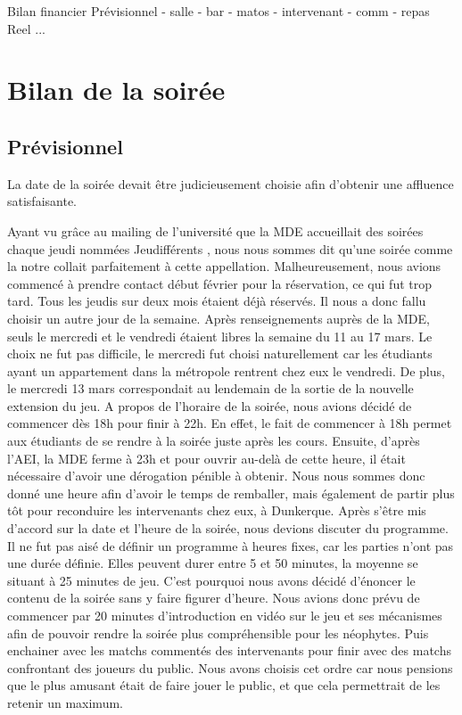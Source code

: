 Bilan financier
        Prévisionnel
            - salle
            - bar
            - matos
            - intervenant
            - comm
            - repas
        Reel
           ...

\section{Bilan de la soirée}%
\label{sec:Bilan_de_la_soiree}

\subsection{Prévisionnel}%
\label{sub:previsionnel}

La date de la soirée devait être judicieusement choisie afin d'obtenir une affluence satisfaisante.

Ayant vu grâce au mailing de l’université que la MDE accueillait des soirées chaque jeudi
nommées \og Jeudifférents \fg{}, nous nous sommes dit qu’une soirée comme la notre collait
parfaitement à cette appellation. Malheureusement, nous avions commencé à prendre contact
début février pour la réservation, ce qui fut trop tard. Tous les jeudis sur deux mois étaient
déjà réservés.
Il nous a donc fallu choisir un autre jour de la semaine. Après renseignements auprès de la
MDE, seuls le mercredi et le vendredi étaient libres la semaine du 11 au 17 mars. Le choix ne
fut pas difficile, le mercredi fut choisi naturellement car les étudiants ayant un appartement
dans la métropole rentrent chez eux le vendredi. De plus, le mercredi 13 mars correspondait
au lendemain de la sortie de la nouvelle extension du jeu.
A propos de l’horaire de la soirée, nous avions décidé de commencer dès 18h pour finir à
22h. En effet, le fait de commencer à 18h permet aux étudiants de se rendre à la soirée juste
après les cours. Ensuite, d’après l’AEI, la MDE ferme à 23h et pour ouvrir au-delà de cette
heure, il était nécessaire d’avoir une dérogation pénible à obtenir. Nous nous sommes donc
donné une heure afin d’avoir le temps de remballer, mais également de partir plus tôt pour
reconduire les intervenants chez eux, à Dunkerque.
Après s’être mis d’accord sur la date et l’heure de la soirée, nous devions discuter du
programme.
Il ne fut pas aisé de définir un programme à heures fixes, car les parties n’ont pas une durée
définie. Elles peuvent durer entre 5 et 50 minutes, la moyenne se situant à 25 minutes de jeu.
C’est pourquoi nous avons décidé d’énoncer le contenu de la soirée sans y faire figurer
d’heure.
Nous avions donc prévu de commencer par 20 minutes d’introduction en vidéo sur le jeu et
ses mécanismes afin de pouvoir rendre la soirée plus compréhensible pour les néophytes.
Puis enchainer avec les matchs commentés des intervenants pour finir avec des matchs
confrontant des joueurs du public. Nous avons choisis cet ordre car nous pensions que le plus
amusant était de faire jouer le public, et que cela permettrait de les retenir un maximum.

